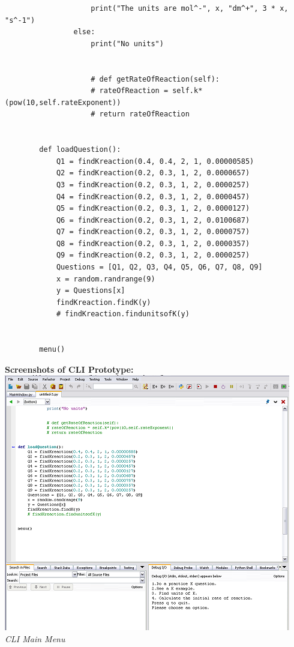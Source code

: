 \documentclass[a4paper,12pt]{report}
\begin{document}
\begin{verbatim}
                    print("The units are mol^-", x, "dm^+", 3 * x, "s^-1")
                else:
                    print("No units")
        
        
                    # def getRateOfReaction(self):
                    # rateOfReaction = self.k*(pow(10,self.rateExponent))
                    # return rateOfReaction
        
        
        def loadQuestion():
            Q1 = findKreaction(0.4, 0.4, 2, 1, 0.00000585)
            Q2 = findKreaction(0.2, 0.3, 1, 2, 0.0000657)
            Q3 = findKreaction(0.2, 0.3, 1, 2, 0.0000257)
            Q4 = findKreaction(0.2, 0.3, 1, 2, 0.0000457)
            Q5 = findKreaction(0.2, 0.3, 1, 2, 0.0000127)
            Q6 = findKreaction(0.2, 0.3, 1, 2, 0.0100687)
            Q7 = findKreaction(0.2, 0.3, 1, 2, 0.0000757)
            Q8 = findKreaction(0.2, 0.3, 1, 2, 0.0000357)
            Q9 = findKreaction(0.2, 0.3, 1, 2, 0.0000257)
            Questions = [Q1, Q2, Q3, Q4, Q5, Q6, Q7, Q8, Q9]
            x = random.randrange(9)
            y = Questions[x]
            findKreaction.findK(y)
            # findKreaction.findunitsofK(y)
        
        
        menu()
\end{verbatim}
\clearpage
\textbf{Screenshots of CLI Prototype:}\\
\bigskip
\includegraphics{CLI01}\\
\emph{CLI Main Menu}\\
\end{document}
